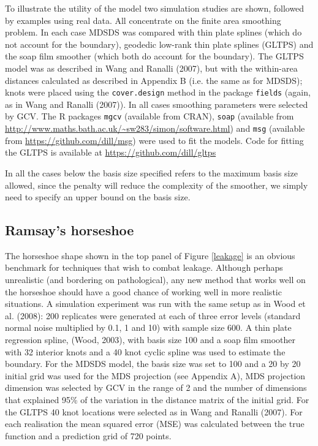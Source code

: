 \documentclass[useAMS, referee]{biom}
\begin{document}
To illustrate the utility of the model two simulation studies are shown, followed by examples using real data. All concentrate on the finite area smoothing problem. In each case MDSDS was compared with thin plate splines (which do not account for the boundary), geodedic low-rank thin plate splines (GLTPS) and the soap film smoother (which both do account for the boundary). The GLTPS model was as described in Wang and Ranalli (2007), but with the within-area distances calculated as described in Appendix B (i.e. the same as for MDSDS); knots were placed using the \texttt{cover.design} method in the package \texttt{fields} (again, as in Wang and Ranalli (2007)). In all cases smoothing parameters were selected by GCV. The \textsf{R} packages \texttt{mgcv} (available from CRAN), \texttt{soap} (available from \url{http://www.maths.bath.ac.uk/~sw283/simon/software.html}) and \texttt{msg} (available from \url{https://github.com/dill/msg}) were used to fit the models. Code for fitting the GLTPS is available at \url{https://github.com/dill/gltps}

In all the cases below the basis size specified refers to the maximum basis size allowed, since the penalty will reduce the complexity of the smoother, we simply need to specify an upper bound on the basis size.


\subsection{Ramsay's horseshoe}

The horseshoe shape shown in the top panel of Figure \ref{leakage} is an obvious benchmark for techniques that wish to combat leakage. Although perhaps unrealistic (and bordering on pathological), any new method that works well on the horseshoe should have a good chance of working well in more realistic situations. A simulation experiment was run with the same setup as in Wood et al. (2008): 200 replicates were generated at each of three error levels (standard normal noise multiplied by 0.1, 1 and 10) with sample size 600. A thin plate regression spline, (Wood, 2003), with basis size 100 and a soap film smoother with 32 interior knots  and a 40 knot cyclic  spline was used to estimate the boundary. For the MDSDS model, the basis size was set to 100 and a 20 by 20 initial grid was used for the MDS projection (see Appendix A), MDS projection dimension was selected by GCV in the range of 2 and the number of dimensions that explained 95\% of the variation in the distance matrix of the initial grid. For the GLTPS 40 knot locations were selected as in Wang and Ranalli (2007). For each realisation the mean squared error (MSE) was calculated between the true function and a prediction grid of 720 points.
\end{document}
